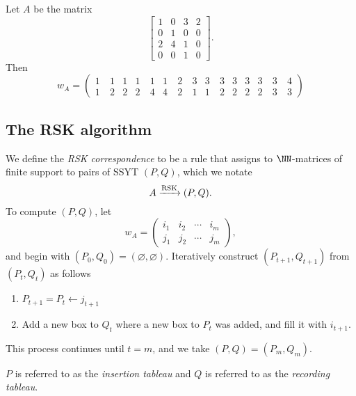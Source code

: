 \documentclass{article}
\DeclareMathOperator{\RSK}{RSK}
\newcommand{\rskarrow}{\ensuremath\xrightarrow{\RSK}}
\begin{document}
\begin{example}
    Let $A$ be the matrix
    \[
        \begin{bmatrix}
            1 & 0 & 3 & 2 \\
            0 & 1 & 0 & 0 \\
            2 & 4 & 1 & 0 \\
            0 & 0 & 1 & 0
        \end{bmatrix}.
    \]
    Then 
    \[
        w_A = \begin{pmatrix}
            1 & 1 & 1 & 1 & 1 & 1 \
              & 2 \
              & 3 & 3 & 3 & 3 & 3 & 3 & 3\
              & 4 \\
            1 \
              & 2 & 2 & 2 \
              & 4 & 4 \
              & 2 \
              & 1 & 1 \
              & 2 & 2 & 2 & 2 \
              & 3 \
              & 3
        \end{pmatrix}
    \]
\end{example}

\subsection{The RSK algorithm}

\begin{definition}
    We define the \textit{RSK correspondence} to be a rule that assigns to $\NN$-matrices of finite support to pairs of SSYT $(P, Q)$, which we notate
    \[
        A \rskarrow (P, Q).
    \]
    To compute $(P, Q)$, let 
    \[
        w_A = \begin{pmatrix}
            i_1 & i_2 & \cdots & i_m \\
            j_1 & j_2 & \cdots & j_m
        \end{pmatrix},
    \]
    and begin with $(P_0, Q_0) = (\varnothing, \varnothing)$. Iteratively construct $(P_{t+1}, Q_{t+1})$ from $(P_t,Q_t)$ as follows
    \begin{enumerate}[label=(\alph*)]
        \item $P_{t+1} = P_t \leftarrow j_{t+1}$
        \item Add a new box to $Q_t$ where a new box to $P_t$ was added, and fill it with $i_{t+1}$.
    \end{enumerate}
    This process continues until $t=m$, and we take $(P, Q) = (P_m, Q_m)$.

    $P$ is referred to as the \textit{insertion tableau} and $Q$ is referred to as the \textit{recording tableau}.
\end{definition}
\end{document}
